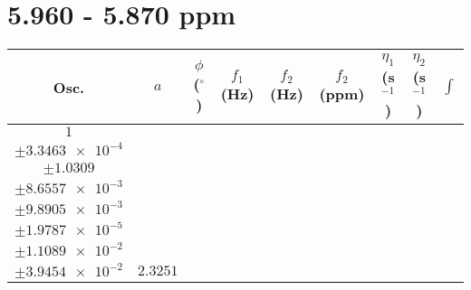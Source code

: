 \documentclass[8pt]{article}
\begin{document}
\section*{5.960 - 5.870 ppm}
\begin{longtable}[l]{c c c c c c c c c}
\toprule
Osc. & $a$ & $\phi$ ($^{\circ}$) & $f_1$ (Hz) & $f_2$ (Hz) & $f_2$ (ppm) & $\eta_1$ (s$^{-1}$) & $\eta_2$ (s$^{-1}$) & $\int$\\
\midrule
$\num{1}$ & \begin{tabular}[c]{@{}c@{}}$\num{3.3592e-2}$ \\ $\pm\num{3.3463e-4}$\end{tabular} & \begin{tabular}[c]{@{}c@{}}$\num{-2.707}$ \\ $\pm\num{1.0309}$\end{tabular} & \begin{tabular}[c]{@{}c@{}}$\num{-7.4422}$ \\ $\pm\num{8.6557e-3}$\end{tabular} & \begin{tabular}[c]{@{}c@{}}$\num{2.9493e+3}$ \\ $\pm\num{9.8905e-3}$\end{tabular} & \begin{tabular}[c]{@{}c@{}}$\num{5.9001}$ \\ $\pm\num{1.9787e-5}$\end{tabular} & \begin{tabular}[c]{@{}c@{}}$\num{2.6656}$ \\ $\pm\num{1.1089e-2}$\end{tabular} & \begin{tabular}[c]{@{}c@{}}$\num{4.0068}$ \\ $\pm\num{3.9454e-2}$\end{tabular} & $\num{2.3251}$\\

\end{longtable}
\end{document}
